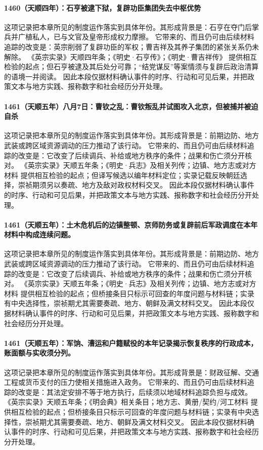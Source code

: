 \paragraph{1460（天顺四年）：石亨被逮下狱，复辟功臣集团失去中枢优势} 这项记录把本章所见的制度运作落实到具体年份。其形成背景是：石亨在夺门后掌兵并广植私人，已与文官及皇帝形成权力摩擦。 它带来的、而且仍可由后续材料追踪的改变是：英宗削弱了复辟功臣的军权；曹吉祥及其养子集团的紧张关系仍未解除。 《英宗实录》天顺四年条；《明史·石亨传》；《明史·曹吉祥传》 提供相互检验的起点；但石亨被逮及其后处分可靠；“结党谋反”等案情须与复辟后政治清算的语境一并阅读。 因此本段仅据材料确认事件的时序、行动和可见后果，并把政策文本与地方实践、报称数字和社会经历分开处理。

\paragraph{1461（天顺五年）八月7日：曹钦之乱：曹钦叛乱并试图攻入北京，但被捕并被迫自杀} 这项记录把本章所见的制度运作落实到具体年份。其形成背景是：前期边防、地方武装或跨区域资源调动的压力推动了该行动。 它带来的、而且仍可由后续材料追踪的改变是：它改变了后续调兵、补给或地方秩序的条件；战果和伤亡须分开核对。 《英宗实录》天顺五年条；《明史·兵志》及相关列传；边镇、地方志或对方材料 提供相互检验的起点；但译写候选以编年材料定位；实录记载反映朝廷选择，崇祯期须另以奏疏、地方及敌对政权材料交叉。 因此本段仅据材料确认事件的时序、行动和可见后果，并把政策文本与地方实践、报称数字和社会经历分开处理。

\paragraph{1461（天顺五年）：土木危机后的边镇整顿、京师防务或复辟前后军政调度在本年材料中构成连续问题。} 这项记录把本章所见的制度运作落实到具体年份。其形成背景是：前期边防、地方武装或跨区域资源调动的压力推动了该行动。 它带来的、而且仍可由后续材料追踪的改变是：它改变了后续调兵、补给或地方秩序的条件；战果和伤亡须分开核对。 《英宗实录》天顺五年条；《明史·兵志》及相关列传；边镇、地方志或对方材料 提供相互检验的起点；但桥接条目只标示可回查的年度问题与材料链；实录有中央选择性，崇祯期尤其需要奏疏、地方、朝鲜及满文材料交叉。 因此本段仅据材料确认事件的时序、行动和可见后果，并把政策文本与地方实践、报称数字和社会经历分开处理。

\paragraph{1461（天顺五年）：军饷、漕运和户籍赋役的本年记录揭示恢复秩序的行政成本，账面额与实收须分列。} 这项记录把本章所见的制度运作落实到具体年份。其形成背景是：财政征解、交通工程或货币支付的压力使相关措施进入政务。 它带来的、而且仍可由后续材料追踪的改变是：其法定安排不等于地方执行，后续须以地域材料追踪负担与成效。 《英宗实录》天顺五年条；《明会典》相关条目；地方志、黄册/契约/河工材料 提供相互检验的起点；但桥接条目只标示可回查的年度问题与材料链；实录有中央选择性，崇祯期尤其需要奏疏、地方、朝鲜及满文材料交叉。 因此本段仅据材料确认事件的时序、行动和可见后果，并把政策文本与地方实践、报称数字和社会经历分开处理。

